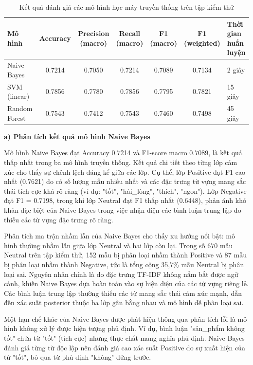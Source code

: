 \documentclass[14pt, a4paper]{report}
\begin{document}
\begin{table}[h]
\centering
\scriptsize
\caption{Kết quả đánh giá các mô hình học máy truyền thống trên tập kiểm thử}
\begin{tabular}{|p{2.2cm}|c|c|c|c|c|p{1.6cm}|}
\hline
\textbf{Mô hình} & \textbf{Accuracy} & \textbf{Precision (macro)} & \textbf{Recall (macro)} & \textbf{F1 (macro)} & \textbf{F1 (weighted)} & \textbf{Thời gian huấn luyện} \\
\hline
Naive Bayes & 0.7214 & 0.7050 & 0.7214 & 0.7089 & 0.7134 & 2 giây \\
\hline
SVM (linear) & 0.7856 & 0.7780 & 0.7856 & 0.7795 & 0.7821 & 15 giây \\
\hline
Random Forest & 0.7543 & 0.7412 & 0.7543 & 0.7460 & 0.7498 & 45 giây \\
\hline
\end{tabular}
\normalsize
\end{table}




\textbf{a) Phân tích kết quả mô hình Naive Bayes}


Mô hình Naive Bayes đạt Accuracy 0.7214 và F1-score macro 0.7089, là kết quả thấp nhất trong ba mô hình truyền thống. Kết quả chi tiết theo từng lớp cảm xúc cho thấy sự chênh lệch đáng kể giữa các lớp. Cụ thể, lớp Positive đạt F1 cao nhất (0.7621) do có số lượng mẫu nhiều nhất và các đặc trưng từ vựng mang sắc thái tích cực khá rõ ràng (ví dụ: "tốt", "hài\_lòng", "thích", "ngon"). Lớp Negative đạt F1 = 0.7198, trong khi lớp Neutral đạt F1 thấp nhất (0.6448), phản ánh khó khăn đặc biệt của Naive Bayes trong việc nhận diện các bình luận trung lập do thiếu các từ vựng đặc trưng rõ ràng.


Phân tích ma trận nhầm lẫn của Naive Bayes cho thấy xu hướng nổi bật: mô hình thường nhầm lẫn giữa lớp Neutral và hai lớp còn lại. Trong số 670 mẫu Neutral trên tập kiểm thử, 152 mẫu bị phân loại nhầm thành Positive và 87 mẫu bị phân loại nhầm thành Negative, tức là tổng cộng 35,7\% mẫu Neutral bị phân loại sai. Nguyên nhân chính là do đặc trưng TF-IDF không nắm bắt được ngữ cảnh, khiến Naive Bayes dựa hoàn toàn vào sự hiện diện của các từ vựng riêng lẻ. Các bình luận trung lập thường thiếu các từ mang sắc thái cảm xúc mạnh, dẫn đến xác suất posterior thuộc ba lớp gần bằng nhau và mô hình dễ phân loại sai.


Một hạn chế khác của Naive Bayes được phát hiện thông qua phân tích lỗi là mô hình không xử lý được hiện tượng phủ định. Ví dụ, bình luận "sản\_phẩm không tốt" chứa từ "tốt" (tích cực) nhưng thực chất mang nghĩa phủ định. Naive Bayes đánh giá từng từ độc lập nên đánh giá cao xác suất Positive do sự xuất hiện của từ "tốt", bỏ qua từ phủ định "không" đứng trước.
\end{document}

